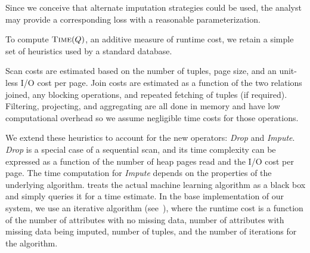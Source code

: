 Since we conceive that
alternate imputation strategies could be used, the analyst may provide a corresponding
loss with a reasonable parameterization.

To compute $\textsc{Time}(Q)$, an additive measure of runtime cost, we retain a simple set of heuristics used by a standard 
database. 


Scan costs are estimated based on the number of tuples, 
page size, and an unit-less I/O cost per page. Join costs are estimated as a function
of the two relations joined, any blocking operations, and repeated fetching of tuples (if required).
Filtering, projecting, and aggregating are all done in memory and have low computational overhead
so we assume negligible time costs for those operations. 

We extend these heuristics to 
account for the new operators: \textit{Drop} and \textit{Impute}. \textit{Drop} is a special case of a sequential scan, and its time
complexity can be expressed as a function of the number of heap pages read and the I/O cost
per page. The time computation for \textit{Impute} depends on the properties of the underlying
algorithm. \ProjectName{} treats the actual machine learning algorithm as a black box
and simply queries it for a time estimate. In the base implementation of our system,
we use an iterative algorithm (see~), where the runtime cost
is a function of the number of attributes with no missing data, number of attributes with
missing data being imputed, number of tuples, and the number of iterations for the algorithm.

